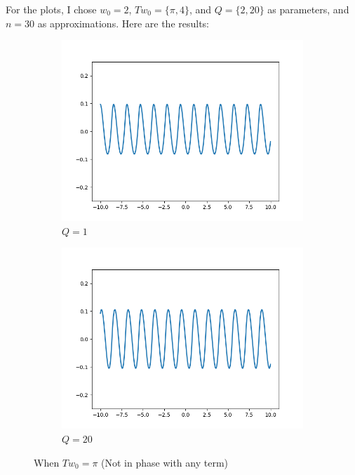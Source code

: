 \documentclass{article}
\begin{document}
For the plots, I chose $w_0=2$, $Tw_0 = \{\pi, 4\}$, and $Q=\{2,20\}$ as parameters, and $n=30$ as approximations. Here are the results:
\begin{figure}[h!]
    \centering
     \begin{subfigure}[b]{0.45\textwidth}
         \centering
         \includegraphics[width=\linewidth]{0,0.png}
         \caption{$Q=1$}
     \end{subfigure}
     \begin{subfigure}[b]{0.45\textwidth}
         \centering
         \includegraphics[width=\linewidth]{0,1.png}
         \caption{$Q=20$}
     \end{subfigure}
     \caption{When $Tw_0 = \pi$ (Not in phase with any term)}
\end{figure}
\end{document}
